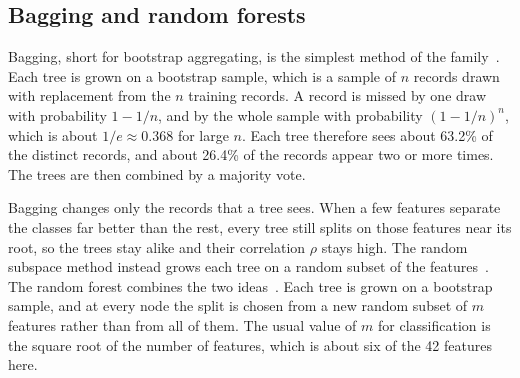 \documentclass[conference,10pt]{IEEEtran}
\begin{document}
\subsection{Bagging and random forests}
\label{subsec:bg_rf}
%

Bagging, short for bootstrap aggregating, is the simplest method of the
family~\cite{breiman1996bagging}. Each tree is grown on a bootstrap sample,
which is a sample of $n$ records drawn with replacement from the $n$
training records. A record is missed by one draw with probability $1-1/n$,
and by the whole sample with probability $(1-1/n)^n$, which is about
$1/e \approx 0.368$ for large $n$. Each tree therefore sees about 63.2\% of
the distinct records, and about 26.4\% of the records appear two or more times. The trees are then
combined by a majority vote.

Bagging changes only the records that a tree sees. When a few features
separate the classes far better than the rest, every tree still splits on
those features near its root, so the trees stay alike and their correlation
$\rho$ stays high. The random subspace method instead grows each tree on a
random subset of the features~\cite{ho1998random}. The random forest
combines the two ideas~\cite{breiman2001random}. Each tree is grown on a
bootstrap sample, and at every node the split is chosen from a new random
subset of $m$ features rather than from all of them. The usual value of $m$
for classification is the square root of the number of features, which is
about six of the 42 features here. 
\end{document}
